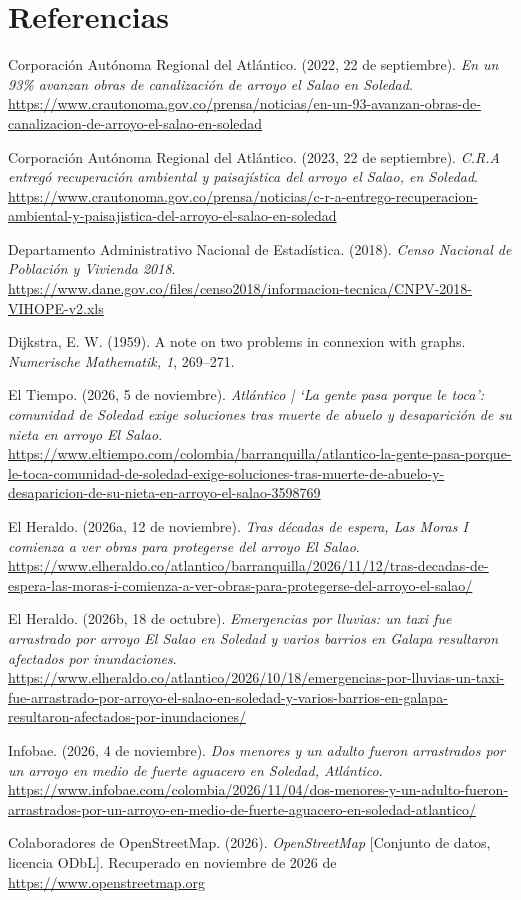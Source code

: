 \documentclass[12pt,letterpaper]{article}
\newenvironment{referencias}{\par\raggedright\setlength{\leftskip}{1.27cm}\setlength{\parindent}{-1.27cm}\setlength{\parskip}{0.5em}}{\par}
\begin{document}
\section*{Referencias}
\begin{referencias}
Corporación Autónoma Regional del Atlántico. (2022, 22 de septiembre). \textit{En un 93\% avanzan obras de canalización de arroyo el Salao en Soledad}. \url{https://www.crautonoma.gov.co/prensa/noticias/en-un-93-avanzan-obras-de-canalizacion-de-arroyo-el-salao-en-soledad}

Corporación Autónoma Regional del Atlántico. (2023, 22 de septiembre). \textit{C.R.A entregó recuperación ambiental y paisajística del arroyo el Salao, en Soledad}. \url{https://www.crautonoma.gov.co/prensa/noticias/c-r-a-entrego-recuperacion-ambiental-y-paisajistica-del-arroyo-el-salao-en-soledad}

Departamento Administrativo Nacional de Estadística. (2018). \textit{Censo Nacional de Población y Vivienda 2018}. \url{https://www.dane.gov.co/files/censo2018/informacion-tecnica/CNPV-2018-VIHOPE-v2.xls}

Dijkstra, E. W. (1959). A note on two problems in connexion with graphs. \textit{Numerische Mathematik, 1}, 269--271.

El Tiempo. (2026, 5 de noviembre). \textit{Atlántico | `La gente pasa porque le toca': comunidad de Soledad exige soluciones tras muerte de abuelo y desaparición de su nieta en arroyo El Salao}. \url{https://www.eltiempo.com/colombia/barranquilla/atlantico-la-gente-pasa-porque-le-toca-comunidad-de-soledad-exige-soluciones-tras-muerte-de-abuelo-y-desaparicion-de-su-nieta-en-arroyo-el-salao-3598769}

El Heraldo. (2026a, 12 de noviembre). \textit{Tras décadas de espera, Las Moras I comienza a ver obras para protegerse del arroyo El Salao}. \url{https://www.elheraldo.co/atlantico/barranquilla/2026/11/12/tras-decadas-de-espera-las-moras-i-comienza-a-ver-obras-para-protegerse-del-arroyo-el-salao/}

El Heraldo. (2026b, 18 de octubre). \textit{Emergencias por lluvias: un taxi fue arrastrado por arroyo El Salao en Soledad y varios barrios en Galapa resultaron afectados por inundaciones}. \url{https://www.elheraldo.co/atlantico/2026/10/18/emergencias-por-lluvias-un-taxi-fue-arrastrado-por-arroyo-el-salao-en-soledad-y-varios-barrios-en-galapa-resultaron-afectados-por-inundaciones/}

Infobae. (2026, 4 de noviembre). \textit{Dos menores y un adulto fueron arrastrados por un arroyo en medio de fuerte aguacero en Soledad, Atlántico}. \url{https://www.infobae.com/colombia/2026/11/04/dos-menores-y-un-adulto-fueron-arrastrados-por-un-arroyo-en-medio-de-fuerte-aguacero-en-soledad-atlantico/}

Colaboradores de OpenStreetMap. (2026). \textit{OpenStreetMap} [Conjunto de datos, licencia ODbL]. Recuperado en noviembre de 2026 de \url{https://www.openstreetmap.org}
\end{referencias}
\end{document}
